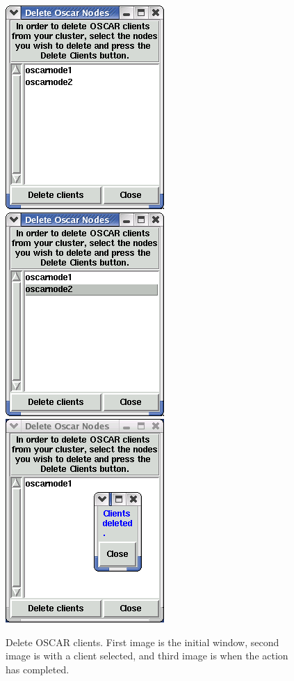 \begin{figure}[!ht]
  \begin{center}
    \centerline{
      \includegraphics[scale=\imgscale]{figs/10a_sbs-del-node}
      \hspace{\imghskip}
      \includegraphics[scale=\imgscale]{figs/10b_sbs-del-node-partA}
      \hspace{\imghskip}
      \includegraphics[scale=\imgscale]{figs/10b_sbs-del-node-partB}
      }
    \caption[Delete OSCAR Clients.]{Delete OSCAR clients.  First image
    is the initial window, second image is with a client selected, and
    third image is when the action has completed.}
    \label{fig:sbs-del-node1}
  \end{center}
\end{figure}


